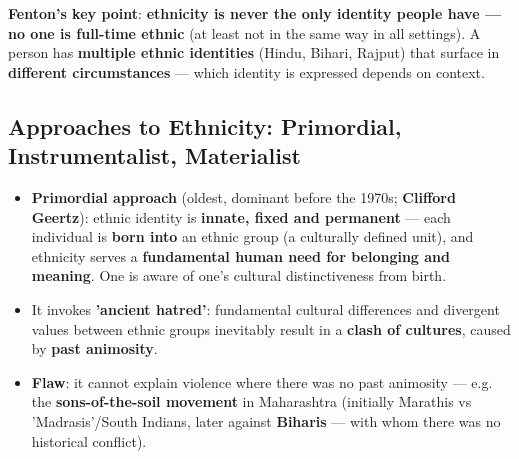 \begin{KeyConcept}
\textbf{Fenton's key point}: \textbf{ethnicity is never the only identity people have --- no one is full-time ethnic} (at least not in the same way in all settings). A person has \textbf{multiple ethnic identities} (Hindu, Bihari, Rajput) that surface in \textbf{different circumstances} --- which identity is expressed depends on context.
\end{KeyConcept}

\subsection{Approaches to Ethnicity: Primordial, Instrumentalist, Materialist}

\begin{KeyConcept}
\begin{itemize}
\item \textbf{Primordial approach} (oldest, dominant before the 1970s; \textbf{Clifford Geertz}): ethnic identity is \textbf{innate, fixed and permanent} --- each individual is \textbf{born into} an ethnic group (a culturally defined unit), and ethnicity serves a \textbf{fundamental human need for belonging and meaning}. One is aware of one's cultural distinctiveness from birth.
\item It invokes \textbf{'ancient hatred'}: fundamental cultural differences and divergent values between ethnic groups inevitably result in a \textbf{clash of cultures}, caused by \textbf{past animosity}.
\item \textbf{Flaw}: it cannot explain violence where there was no past animosity --- e.g. the \textbf{sons-of-the-soil movement} in Maharashtra (initially Marathis vs 'Madrasis'/South Indians, later against \textbf{Biharis} --- with whom there was no historical conflict).
\end{itemize}
\end{KeyConcept}

